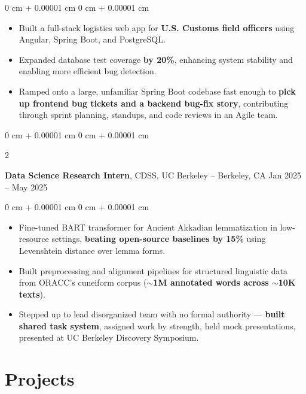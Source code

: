 \documentclass[10pt, letterpaper]{article}
\newenvironment{highlights}{
    \begin{itemize}[
        topsep=0.3 cm,
        parsep=0.09 cm,
        partopsep=0pt,
        itemsep=0.05 cm,
        leftmargin=0 cm + 10pt
    ]
}{
    \end{itemize}
} %
\newenvironment{onecolentry}{
    \begin{adjustwidth}{
        0 cm + 0.00001 cm
    }{
        0 cm + 0.00001 cm
    }
}{
    \end{adjustwidth}
} %
\newenvironment{twocolentry}[2][]{
    \onecolentry
    \def\secondColumn{#2}
    \setcolumnwidth{\fill, 4.5 cm}
    \begin{paracol}{2}
}{
    \switchcolumn \raggedleft \secondColumn
    \end{paracol}
    \endonecolentry
} %
\begin{document}
        \vspace{0.11 cm}
        \begin{onecolentry}
            \begin{highlights}
                \item Built a full-stack logistics web app for \textbf{U.S. Customs field officers} using Angular, Spring Boot, and PostgreSQL.
                \item Expanded database test coverage \textbf{by 20\%}, enhancing system stability and enabling more efficient bug detection.
                \item Ramped onto a large, unfamiliar Spring Boot codebase fast enough to \textbf{pick up frontend bug tickets and a backend bug-fix story}, contributing through sprint planning, standups, and code reviews in an Agile team.
            \end{highlights}
        \end{onecolentry}

        \vspace{0.11 cm}

        \begin{twocolentry}{
            Jan 2025 – May 2025
        }
            \textbf{Data Science Research Intern}, CDSS, UC Berkeley -- Berkeley, CA\end{twocolentry}

        \vspace{0.11 cm}
        \begin{onecolentry}
            \begin{highlights}
                \item Fine-tuned BART transformer for Ancient Akkadian lemmatization in low-resource settings, \textbf{beating open-source baselines by 15\%} using Levenshtein distance over lemma forms.
                \item Built preprocessing and alignment pipelines for structured linguistic data from ORACC's cuneiform corpus (\textbf{$\sim$1M annotated words across $\sim$10K texts}).
                \item Stepped up to lead disorganized team with no formal authority — \textbf{built shared task system}, assigned work by strength, held mock presentations, presented at UC Berkeley Discovery Symposium.
            \end{highlights}
       \end{onecolentry}

    \section{Projects}
\end{document}
